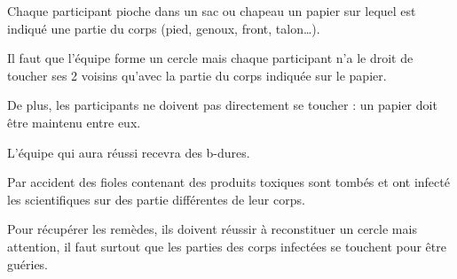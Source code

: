 \documentclass{grand-jeu}
\begin{document}
\begin{liste-materiel}
\end{liste-materiel}

\begin{regles}
Chaque participant pioche dans un sac ou chapeau un papier sur lequel est indiqué une partie du corps (pied, genoux, front, talon…).

Il faut que l’équipe forme un cercle mais chaque participant n’a le droit de toucher ses 2 voisins qu’avec la partie du corps indiquée sur le papier.

De plus, les participants ne doivent pas directement se toucher : un papier doit être maintenu entre eux.

L’équipe qui aura réussi recevra des b-dures.
\end{regles}

\begin{imaginaire}
Par accident des fioles contenant des produits toxiques sont tombés et ont infecté les scientifiques sur des partie différentes de leur corps.

Pour récupérer les remèdes, ils doivent réussir à reconstituer un cercle mais attention, il faut surtout que les parties des corps infectées se touchent pour être guéries.
\end{imaginaire}

\begin{moments-stop}
\end{moments-stop}
\end{document}
